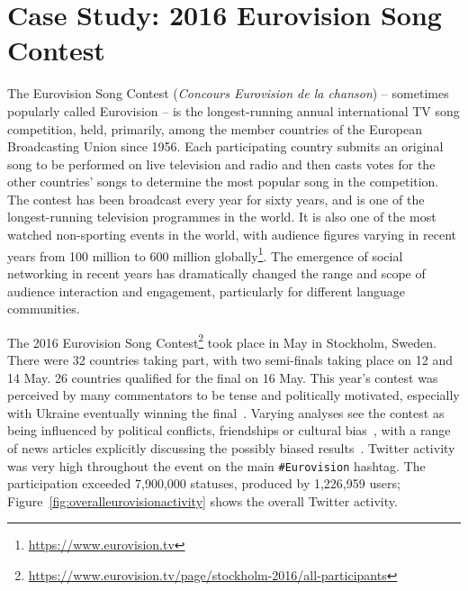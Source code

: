 \section{Case Study: 2016 Eurovision Song Contest}\label{eurovisioncasestudy}

The Eurovision Song Contest ({\emph{Concours Eurovision de la
chanson}}) -- sometimes popularly called Eurovision -- is the
longest-running annual international TV song competition, held,
primarily, among the member countries of the European Broadcasting
Union since 1956. Each participating country submits an original
song to be performed on live television and radio and then casts votes
for the other countries' songs to determine the most popular song in
the competition. The contest has been broadcast every year for sixty
years, and is one of the longest-running television programmes in the
world. It is also one of the most watched non-sporting events in the
world, with audience figures varying in recent years from 100 million
to 600 million globally\footnote{\url{https://www.eurovision.tv}}. The
emergence of social networking in recent years has dramatically
changed the range and scope of audience interaction and engagement,
particularly for different language communities.

The 2016 Eurovision Song
Contest\footnote{\url{https://www.eurovision.tv/page/stockholm-2016/all-participants}}
took place in May in Stockholm, Sweden. There were 32 countries taking
part, with two semi-finals taking place on 12 and 14 May. 26 countries
qualified for the final on 16 May. This year’s contest was perceived
by many commentators to be tense and politically motivated, especially
with Ukraine eventually winning the
final~\cite{telegrapheuroboycott:2016}. Varying analyses see the
contest as being influenced by political conflicts, friendships or
cultural
bias~\cite{ginsburgh+noury:2008,charron:2013,blangiardo+baio:2014,budzinski+pannicke:2016},
with a range of news articles explicitly discussing the possibly
biased results~\cite{telegrapheurobias:2016}.  Twitter activity was
very high throughout the event on the main {\texttt{\#Eurovision}}
hashtag. The participation exceeded 7,900,000 statuses, produced by
1,226,959 users; Figure~\ref{fig:overalleurovisionactivity} shows the overall
Twitter activity.

